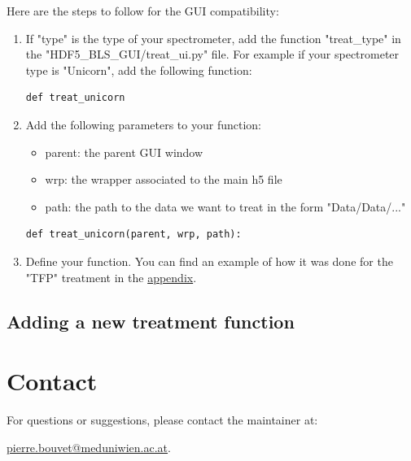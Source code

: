\documentclass[a4paper,12pt]{article}
\begin{document}
        Here are the steps to follow for the GUI compatibility:
        \begin{enumerate}
            \item If "type" is the type of your spectrometer, add the function "treat\_type" in the "HDF5\_BLS\_GUI/treat\_ui.py" file. For example if your spectrometer type is "Unicorn", add the following function:
\begin{lstlisting}
def treat_unicorn
\end{lstlisting}
            \item Add the following parameters to your function:
            \begin{itemize}
                \item parent: the parent GUI window
                \item wrp: the wrapper associated to the main h5 file
                \item path: the path to the data we want to treat in the form "Data/Data/..."
            \end{itemize}
\begin{lstlisting}
def treat_unicorn(parent, wrp, path):
\end{lstlisting}
            \item Define your function. You can find an example of how it was done for the "TFP" treatment in the \hyperref[subsec:example_treatment.TFP]{appendix}.
        \end{enumerate}
    
    \subsection{Adding a new treatment function} \label{subsec:treatment.new}


\section*{Contact}
For questions or suggestions, please contact the maintainer at:

\begin{center}
    \href{mailto:pierre.bouvet@meduniwien.ac.at}{pierre.bouvet@meduniwien.ac.at}.
\end{center}





\appendix 
\end{document}
